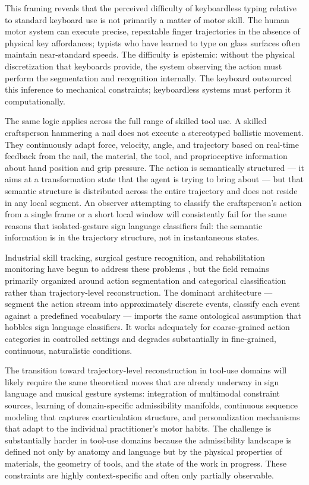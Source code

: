 \documentclass[11pt, a4paper]{article}
\theoremstyle{definition}
\begin{document}
This framing reveals that the perceived difficulty of keyboardless typing relative to standard keyboard use is not primarily a matter of motor skill. The human motor system can execute precise, repeatable finger trajectories in the absence of physical key affordances; typists who have learned to type on glass surfaces often maintain near-standard speeds. The difficulty is epistemic: without the physical discretization that keyboards provide, the system observing the action must perform the segmentation and recognition internally. The keyboard outsourced this inference to mechanical constraints; keyboardless systems must perform it computationally.

The same logic applies across the full range of skilled tool use. A skilled craftsperson hammering a nail does not execute a stereotyped ballistic movement. They continuously adapt force, velocity, angle, and trajectory based on real-time feedback from the nail, the material, the tool, and proprioceptive information about hand position and grip pressure. The action is semantically structured --- it aims at a transformation state that the agent is trying to bring about --- but that semantic structure is distributed across the entire trajectory and does not reside in any local segment. An observer attempting to classify the craftsperson's action from a single frame or a short local window will consistently fail for the same reasons that isolated-gesture sign language classifiers fail: the semantic information is in the trajectory structure, not in instantaneous states.

Industrial skill tracking, surgical gesture recognition, and rehabilitation monitoring have begun to address these problems \cite{tashakori2024}, but the field remains primarily organized around action segmentation and categorical classification rather than trajectory-level reconstruction. The dominant architecture --- segment the action stream into approximately discrete events, classify each event against a predefined vocabulary --- imports the same ontological assumption that hobbles sign language classifiers. It works adequately for coarse-grained action categories in controlled settings and degrades substantially in fine-grained, continuous, naturalistic conditions.

The transition toward trajectory-level reconstruction in tool-use domains will likely require the same theoretical moves that are already underway in sign language and musical gesture systems: integration of multimodal constraint sources, learning of domain-specific admissibility manifolds, continuous sequence modeling that captures coarticulation structure, and personalization mechanisms that adapt to the individual practitioner's motor habits. The challenge is substantially harder in tool-use domains because the admissibility landscape is defined not only by anatomy and language but by the physical properties of materials, the geometry of tools, and the state of the work in progress. These constraints are highly context-specific and often only partially observable.
\end{document}
